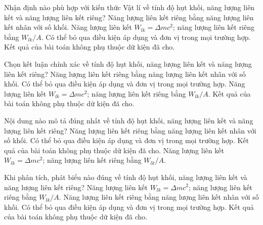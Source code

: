 \begin{ex}
Nhận định nào phù hợp với kiến thức Vật lí về tính độ hụt khối, năng lượng liên kết và năng lượng liên kết riêng?
\choice
{Năng lượng liên kết riêng bằng năng lượng liên kết nhân với số khối.}
{\True Năng lượng liên kết $W_{lk}=\Delta m c^2$; năng lượng liên kết riêng bằng $W_{lk}/A$.}
{Có thể bỏ qua điều kiện áp dụng và đơn vị trong mọi trường hợp.}
{Kết quả của bài toán không phụ thuộc dữ kiện đã cho.}
\end{ex}

\begin{ex}
Chọn kết luận chính xác về tính độ hụt khối, năng lượng liên kết và năng lượng liên kết riêng?
\choice
{Năng lượng liên kết riêng bằng năng lượng liên kết nhân với số khối.}
{Có thể bỏ qua điều kiện áp dụng và đơn vị trong mọi trường hợp.}
{\True Năng lượng liên kết $W_{lk}=\Delta m c^2$; năng lượng liên kết riêng bằng $W_{lk}/A$.}
{Kết quả của bài toán không phụ thuộc dữ kiện đã cho.}
\end{ex}

\begin{ex}
Nội dung nào mô tả đúng nhất về tính độ hụt khối, năng lượng liên kết và năng lượng liên kết riêng?
\choice
{Năng lượng liên kết riêng bằng năng lượng liên kết nhân với số khối.}
{Có thể bỏ qua điều kiện áp dụng và đơn vị trong mọi trường hợp.}
{Kết quả của bài toán không phụ thuộc dữ kiện đã cho.}
{\True Năng lượng liên kết $W_{lk}=\Delta m c^2$; năng lượng liên kết riêng bằng $W_{lk}/A$.}
\end{ex}

\begin{ex}
Khi phân tích, phát biểu nào đúng về tính độ hụt khối, năng lượng liên kết và năng lượng liên kết riêng?
\choice
{\True Năng lượng liên kết $W_{lk}=\Delta m c^2$; năng lượng liên kết riêng bằng $W_{lk}/A$.}
{Năng lượng liên kết riêng bằng năng lượng liên kết nhân với số khối.}
{Có thể bỏ qua điều kiện áp dụng và đơn vị trong mọi trường hợp.}
{Kết quả của bài toán không phụ thuộc dữ kiện đã cho.}
\end{ex}

